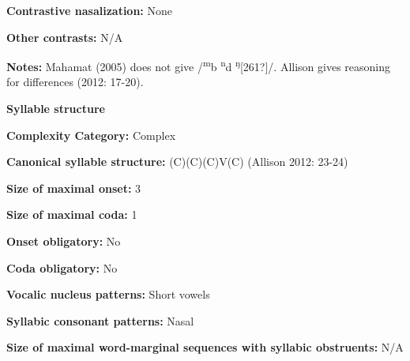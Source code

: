 \begin{styleBody}
\textbf{Contrastive nasalization:} None
\end{styleBody}

\begin{styleBody}
\textbf{Other contrasts:} N/A
\end{styleBody}

\begin{styleBody}
\textbf{Notes:} Mahamat (2005) does not give /\textsuperscript{m}b \textsuperscript{n}d \textsuperscript{ŋ}[261?]/. Allison gives reasoning for differences (2012: 17-20).
\end{styleBody}

\begin{styleBody}
\textbf{Syllable structure}
\end{styleBody}

\begin{styleBody}
\textbf{Complexity Category:} Complex
\end{styleBody}

\begin{styleBody}
\textbf{Canonical syllable structure:} (C)(C)(C)V(C)\textbf{ }(Allison 2012: 23-24)
\end{styleBody}

\begin{styleBody}
\textbf{Size of maximal onset:} 3
\end{styleBody}

\begin{styleBody}
\textbf{Size of maximal coda:} 1
\end{styleBody}

\begin{styleBody}
\textbf{Onset obligatory:} No
\end{styleBody}

\begin{styleBody}
\textbf{Coda obligatory:} No
\end{styleBody}

\begin{styleBody}
\textbf{Vocalic nucleus patterns:} Short vowels
\end{styleBody}

\begin{styleBody}
\textbf{Syllabic consonant patterns:} Nasal
\end{styleBody}

\begin{styleBody}
\textbf{Size of maximal word{}-marginal sequences with syllabic obstruents:} N/A
\end{styleBody}

